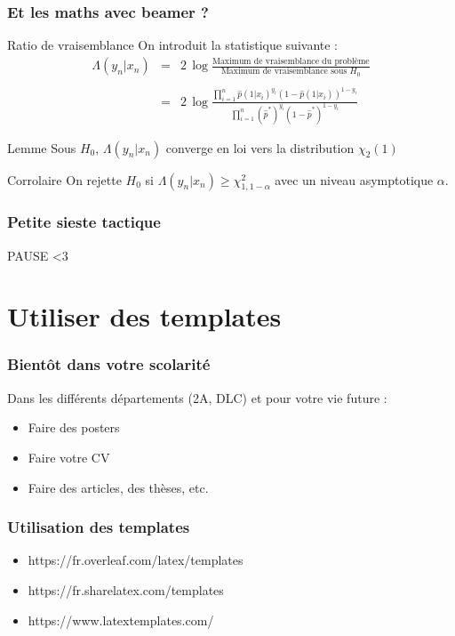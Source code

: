 \documentclass[handout]{beamer}
\begin{document}
\begin{frame}
	\frametitle{Et les maths avec beamer ?}

	\begin{block}{Ratio de vraisemblance}
	    On introduit la statistique suivante :
	    $$
	    \begin{array}{ccl}
	    \Lambda(y_n|x_n) & = & 2\, \log\frac{\mbox{Maximum de vraisemblance du problème}}{\mbox{Maximum de vraisemblance sous } H_0} \\
	    & & \\
	    & = & 2\,\log \frac{\prod_{i=1}^n \hat{p}(1|x_i)^{y_i}(1-\hat{p}(1|x_i))^{1-y_i}}{\prod_{i=1}^n (\hat{p}^*)^{y_i}(1-\hat{p}^*)^{1-y_i}}
	    \end{array}
	    $$
	\end{block}

	\begin{block}{Lemme}
		Sous $H_0$, $\Lambda(y_n|x_n)$ converge en loi vers la distribution $\chi_2(1)$
	\end{block}

	\begin{block}{Corrolaire}
		On rejette $H_0$ si $\Lambda(y_n|x_n) \geq \chi_{1,1-\alpha}^2$ avec un niveau asymptotique $\alpha$.
	\end{block}

\end{frame}

\begin{frame}
	\frametitle{Petite sieste tactique}
	\Huge
	\centering

	PAUSE <3
\end{frame}

\section{Utiliser des templates}

\begin{frame}
	\frametitle{Bientôt dans votre scolarité}
	\centering
	Dans les différents départements (2A, DLC) et pour votre vie future :\\
	\begin{itemize}
		\item Faire des posters
		\item Faire votre CV
		\item Faire des articles, des thèses, etc.
	\end{itemize}
\end{frame}

\begin{frame}
	\frametitle{Utilisation des templates}

	\centering
	\Huge
	\normalsize

	\hspace{2cm}

	\begin{itemize}
		\item https://fr.overleaf.com/latex/templates
		\item https://fr.sharelatex.com/templates
		\item https://www.latextemplates.com/
	\end{itemize}
\end{frame}
\end{document}
